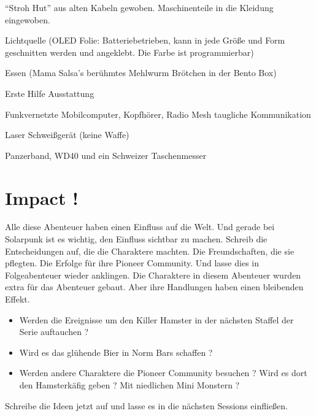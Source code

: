 \begin{npcBox}[title=Spark]
    \begin{stressSection}
    \end{stressSection}
    \begin{tabularx}{\textwidth}{ XX }
    \end{tabularx}

    \begin{consequences}
    \item {}
    \item {}
    \item {}
    \end{consequences}

    \begin{npcDescription}
    \enquote{Stroh Hut} aus alten Kabeln gewoben. Maschinenteile in die Kleidung eingewoben.
    \end{npcDescription}


    \begin{equipment}
    \item Lichtquelle (OLED Folie: Batteriebetrieben, kann in jede Größe und Form geschnitten werden und angeklebt. Die Farbe ist programmierbar)
    \item Essen (Mama Salsa's berühmtes Mehlwurm Brötchen in der Bento Box)
    \item Erste Hilfe Ausstattung
    \item Funkvernetzte Mobilcomputer, Kopfhörer, Radio Mesh taugliche Kommunikation
    \item Laser Schweißgerät (keine Waffe)
    \item Panzerband, WD40 und ein Schweizer Taschenmesser
    \end{equipment}
\end{npcBox}

\newpage

\section{Impact !}

Alle diese Abenteuer haben einen Einfluss auf die Welt. Und gerade bei Solarpunk ist es wichtig, den Einfluss sichtbar zu machen. Schreib die Entscheidungen auf, die die Charaktere machten. Die Freundschaften, die sie pflegten. Die Erfolge für ihre Pioneer Community. Und lasse dies in Folgeabenteuer wieder anklingen.
Die Charaktere in diesem Abenteuer wurden extra für das Abenteuer gebaut. Aber ihre Handlungen haben einen bleibenden Effekt.

\begin{itemize}
    \item Werden die Ereignisse um den Killer Hamster in der nächsten Staffel der Serie auftauchen ?
    \item Wird es das glühende Bier in Norm Bars schaffen ?
    \item Werden andere Charaktere die Pioneer Community besuchen ? Wird es dort den Hamsterkäfig geben ? Mit niedlichen Mini Monstern ?
\end{itemize}

Schreibe die Ideen jetzt auf und lasse es in die nächsten Sessions einfließen.
